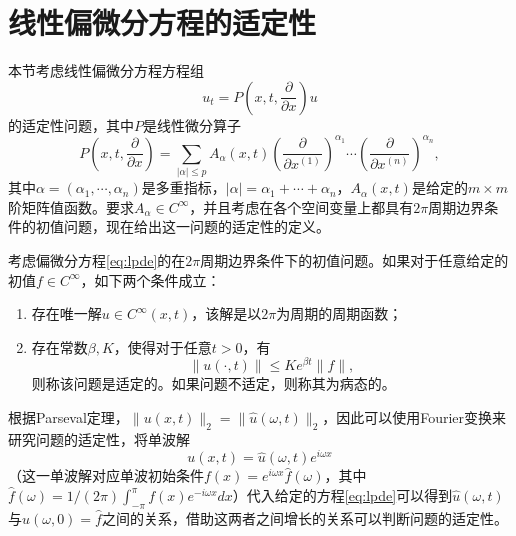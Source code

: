\documentclass[a4paper,10pt]{ctexart}
\begin{document}
\section{线性偏微分方程的适定性}
本节考虑线性偏微分方程方程组
\begin{equation}\label{eq:lpde}
    u_t = P( x,t,\dfrac{\partial }{\partial x})u 
\end{equation}
的适定性问题，其中$ P $是线性微分算子
\begin{equation}
    P(x,t,\dfrac{\partial }{\partial x}) = \sum_{|\alpha|\leqslant p} A_\alpha(x,t) \left( \dfrac{\partial }{\partial x^{(1)}}  \right)^{\alpha_1} \cdots \left( \dfrac{\partial }{\partial x^{(n)}}  \right)^{\alpha_n},
\end{equation}
其中$ \alpha = (\alpha_1,\cdots,\alpha_n) $是多重指标，$ |\alpha| = \alpha_1 + \cdots + \alpha_n $，$ A_\alpha(x,t) $是给定的$ m\times m $阶矩阵值函数。要求$ A_\alpha\in C^\infty $，并且考虑在各个空间变量上都具有$ 2\pi $周期边界条件的初值问题，现在给出这一问题的适定性的定义。
\begin{definition}
    考虑偏微分方程\eqref{eq:lpde}的在$ 2\pi $周期边界条件下的初值问题。如果对于任意给定的初值$ f\in C^\infty $，如下两个条件成立：
    \begin{enumerate}
        \item 存在唯一解$ u\in C^\infty(x,t) $，该解是以$ 2\pi $为周期的周期函数；
        \item 存在常数$ \beta,K $，使得对于任意$ t>0 $，有
        \begin{equation}\label{eq:wellposed}
            \| u(\cdot,t) \| \leqslant Ke^{\beta t} \| f \|,
        \end{equation}
        则称该问题是适定的。如果问题不适定，则称其为病态的。
    \end{enumerate}
\end{definition}

根据Parseval定理，$ \| u(x,t) \|_2 = \| \hat{u}(\omega,t) \|_2 $，因此可以使用Fourier变换来研究问题的适定性，将单波解
\begin{equation}
    u(x,t) = \hat{u}(\omega,t)e^{i \omega x}
\end{equation}
（这一单波解对应单波初始条件$ f(x) = e^{i \omega x}\hat{f}(\omega) $，其中$ \hat{f}(\omega) = 1 / (2 \pi) \int_{-\pi}^\pi f(x)e^{-i \omega x}dx $）代入给定的方程\eqref{eq:lpde}可以得到$ \hat{u}(\omega,t) $与$ \hat{u}(\omega,0)=\hat{f} $之间的关系，借助这两者之间增长的关系可以判断问题的适定性。
\end{document}
